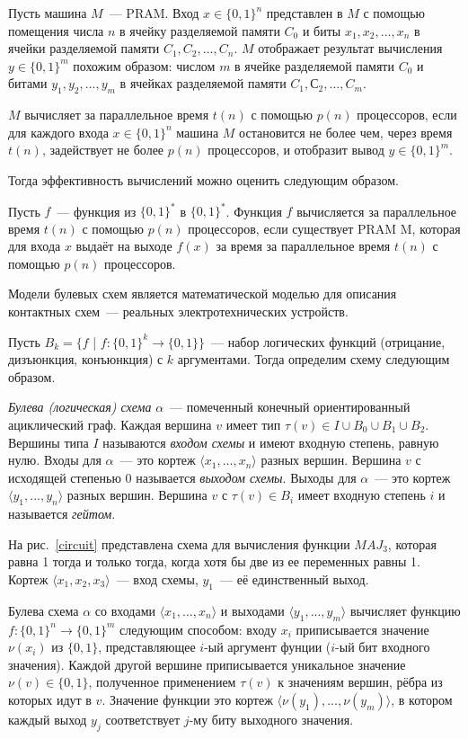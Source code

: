 Пусть машина $M$~--- PRAM. Вход $x \in {\{0, 1\}}^n$ представлен в $M$ с помощью помещения числа $n$ в ячейку разделяемой памяти $C_0$ и биты $x_1, x_2, ..., x_n$ в ячейки разделяемой памяти $C_1, C_2, ..., C_n$. $M$ отображает результат вычисления $y \in {\{0, 1\}}^m$ похожим образом: числом $m$ в ячейке разделяемой памяти $C_0$ и битами $y_1, y_2, ..., y_m$ в ячейках разделяемой памяти $C_1, С_2, ..., C_m$.

$M$ вычисляет за параллельное время $t(n)$ с помощью $p(n)$ процессоров, если для каждого входа $x \in {\{0, 1\}}^n$ машина $M$ остановится не более чем, через время $t(n)$, задействует не более $p(n)$ процессоров, и отобразит вывод $y \in {\{0, 1\}}^m$.

Тогда эффективность вычислений можно оценить следующим образом.

Пусть $f$~--- функция из $ {\{0, 1\}}^*$ в $ {\{0, 1\}}^*$. Функция $f$ вычисляется за параллельное время $t(n)$ с помощью $p(n)$ процессоров, если существует PRAM M, которая для входа $x$ выдаёт на выходе $f(x)$ за время за параллельное время $t(n)$ с помощью $p(n)$ процессоров.

Модели булевых схем является математической моделью для описания контактных схем~--- реальных электротехнических устройств. 

Пусть $B_k = \{f$ | $f: {\{0,1\}}^k \to \{0, 1\}\}$~--- набор логических функций (отрицание, дизъюнкция, конъюнкция) с $k$ аргументами.
Тогда определим схему следующим образом.

\textit{Булева (логическая) схема} $\alpha$~--- помеченный конечный ориентированный ациклический граф. Каждая вершина $v$ имеет тип $\tau(v)  \in I \cup B_0 \cup B_1 \cup B_2$. Вершины типа $I$ называются \textit{входом схемы} и имеют входную степень, равную нулю. Входы для $\alpha$~--- это кортеж $\langle x_1, ..., x_n \rangle$ разных вершин. Вершина $v$ с исходящей степенью 0 называется \textit{выходом схемы}. Выходы для $\alpha$~--- это кортеж $\langle y_1, ..., y_n \rangle$ разных вершин. Вершина $v$ с $\tau(v) \in B_i$ имеет входную степень $i$ и называется \textit{гейтом}.

На рис.~\ref{circuit} представлена схема для вычисления функции ${MAJ}_3$, которая равна 1 тогда и только тогда, когда хотя бы две из ее переменных равны 1. Кортеж $\langle x_1, x_2, x_3 \rangle$~--- вход схемы, $ y_1$~--- её единственный выход.

Булева схема $\alpha$ со входами $\langle x_1, ..., x_n \rangle$ и выходами $\langle y_1, ..., y_m \rangle$ вычисляет функцию $f: {\{0,1\}}^n \to {\{0, 1\}}^m$ следующим способом: входу $x_i$ приписывается значение $\nu(x_i)$ из $\{0, 1\}$, представляющее $i$-ый аргумент фунции ($i$-ый бит входного значения). Каждой другой вершине приписывается уникальное значение $\nu(v) \in \{0, 1\}$, полученное применением $\tau(v)$ к значениям вершин, рёбра из которых идут в $v$. Значение функции это кортеж $\langle \nu(y_1), ..., \nu(y_m) \rangle$, в котором каждый выход $y_j$ соответствует $j$-му биту выходного значения.

